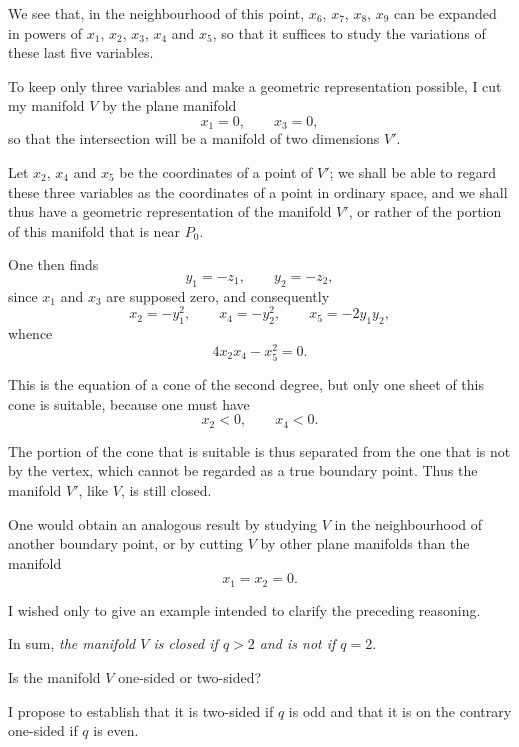 \documentclass{article}
\begin{document}
We see that, in the neighbourhood of this point, $x_{6}$, $x_{7}$, $x_{8}$, $x_{9}$ can be expanded in powers of $x_{1}$, $x_{2}$, $x_{3}$, $x_{4}$ and $x_{5}$, so that it suffices to study the variations of these last five variables.

To keep only three variables and make a geometric representation possible, I cut my manifold $V$ by the plane manifold
\[ x_{1} = 0, \qquad x_{3} = 0, \]
so that the intersection will be a manifold of two dimensions $V'$.

Let $x_{2}$, $x_{4}$ and $x_{5}$ be the coordinates of a point of $V'$; we shall be able to regard these three variables as the coordinates of a point in ordinary space, and we shall thus have a geometric representation of the manifold $V'$, or rather of the portion of this manifold that is near $P_{0}$.

One then finds
\[ y_{1} = -z_{1}, \qquad y_{2} = -z_{2}, \]
since $x_{1}$ and $x_{3}$ are supposed zero, and consequently
\[ x_{2} = -y^{2}_{1}, \qquad x_{4} = -y^{2}_{2}, \qquad x_{5} = -2y_{1}y_{2}, \]
whence
\[ 4x_{2}x_{4} - x^{2}_{5} = 0. \]

This is the equation of a cone of the second degree, but only one sheet of this cone is suitable, because one must have
\[ x_{2} < 0, \qquad x_{4} < 0. \]

The portion of the cone that is suitable is thus separated from the one that is not by the vertex, which cannot be regarded as a true boundary point. Thus the manifold $V'$, like $V$, is still closed.

One would obtain an analogous result by studying $V$ in the neighbourhood of another boundary point, or by cutting $V$ by other plane manifolds than the manifold
\[ x_{1} = x_{2} = 0. \]

I wished only to give an example intended to clarify the preceding reasoning.

In sum, \emph{the manifold $V$ is closed if $q > 2$ and is not if $q = 2$}.

Is the manifold $V$ one-sided or two-sided?

I propose to establish that it is two-sided if $q$ is odd and that it is on the contrary one-sided if $q$ is even.
\end{document}
